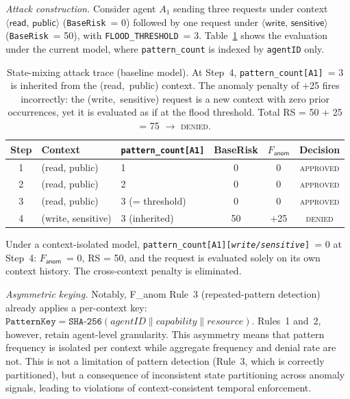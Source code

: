 \documentclass[11pt]{article}
\theoremstyle{definition}
\begin{document}
\emph{Attack construction.}
Consider agent $A_1$ sending three requests under context
$\langle \textsf{read},\, \textsf{public} \rangle$ (\texttt{BaseRisk}~= 0)
followed by one request under $\langle \textsf{write},\, \textsf{sensitive} \rangle$
(\texttt{BaseRisk}~= 50), with \texttt{FLOOD\_THRESHOLD}~= 3.
Table~\ref{tab:state-mixing-trace} shows the evaluation under the current model,
where \texttt{pattern\_count} is indexed by \texttt{agentID} only.

\begin{table}[h!]
\centering
\small
\begin{tabular}{@{}cllccc@{}}
\toprule
\textbf{Step} & \textbf{Context} & \textbf{\texttt{pattern\_count[A1]}} & \textbf{BaseRisk} & $F_{\textsf{anom}}$ & \textbf{Decision} \\
\midrule
1 & (read, public)   & 1 & 0  & 0  & \textsc{approved} \\
2 & (read, public)   & 2 & 0  & 0  & \textsc{approved} \\
3 & (read, public)   & 3 (= threshold) & 0 & 0 & \textsc{approved} \\
4 & (write, sensitive) & 3 (inherited) & 50 & +25 & \textsc{denied} \\
\bottomrule
\end{tabular}
\caption{State-mixing attack trace (baseline model).
At Step~4, \texttt{pattern\_count[A1]}~= 3 is inherited from the (read,~public) context.
The anomaly penalty of +25 fires incorrectly: the (write,~sensitive) request
is a new context with zero prior occurrences, yet it is evaluated as if
at the flood threshold.
Total RS = 50 + 25 = 75 $\to$ \textsc{denied}.}
\label{tab:state-mixing-trace}
\end{table}

Under a context-isolated model, \texttt{pattern\_count[A1][\textit{write/sensitive}]}~= 0
at Step~4: $F_{\textsf{anom}}$~= 0, RS = 50, and the request is evaluated solely
on its own context history.
The cross-context penalty is eliminated.

\emph{Asymmetric keying.}
Notably, F\_anom Rule~3 (repeated-pattern detection) already applies a
per-context key: $\texttt{PatternKey} = \texttt{SHA-256}(\textit{agentID} \parallel \textit{capability} \parallel \textit{resource})$.
Rules~1 and~2, however, retain agent-level granularity.
This asymmetry means that pattern frequency is isolated per context
while aggregate frequency and denial rate are not.
This is not a limitation of pattern detection (Rule~3, which is correctly partitioned),
but a consequence of inconsistent state partitioning across anomaly signals,
leading to violations of context-consistent temporal enforcement.
\end{document}
